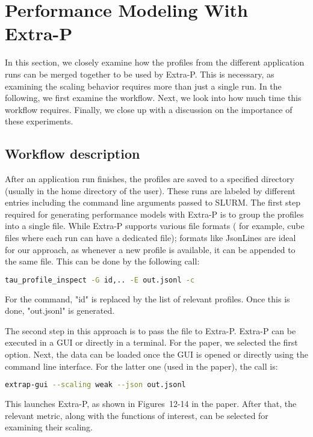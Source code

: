\section{Performance Modeling With Extra-P}
\label{sec:extra-p}
In this section, we closely examine how the profiles from the different application runs 
can be merged together to be used by Extra-P. This is necessary, as examining the scaling 
behavior requires more than just a single run. In the following, we first examine the workflow. 
Next, we look into how much time this workflow requires. Finally, we close up with a discussion 
on the importance of these experiments. 

\subsection{Workflow description}
After an application run finishes, the profiles are saved to a specified directory (usually in 
the home directory of the user). 
These runs are labeled by different entries including the command line arguments passed to SLURM. 
The first step required for generating performance models with Extra-P is to group the 
profiles into a single file. While Extra-P supports various file formats ( 
for example, cube files where each run can have a dedicated file); formats like JsonLines 
are ideal for our approach, as whenever a new profile is available, it can be appended to the same 
file. This can be done by the following call: 
\begin{lstlisting}[language=bash]
tau_profile_inspect -G id,.. -E out.jsonl -c 
\end{lstlisting}
For the command, "id" is replaced by the list of relevant profiles. Once this is done, "out.jsonl" 
is generated. 

The second step in this approach is to pass the file to Extra-P. 
Extra-P can be executed in a GUI or directly in a terminal. For the paper, 
we selected the first option. Next, the data can be loaded once the GUI is opened or 
directly using the command line interface. For the latter one (used in the paper), the call is:
\begin{lstlisting}[language=bash]
extrap-gui --scaling weak --json out.jsonl
\end{lstlisting}

This launches Extra-P, as shown in Figures~12-14 in the paper. After that, the relevant 
metric, along with the functions of interest, can be selected for examining their scaling. 


